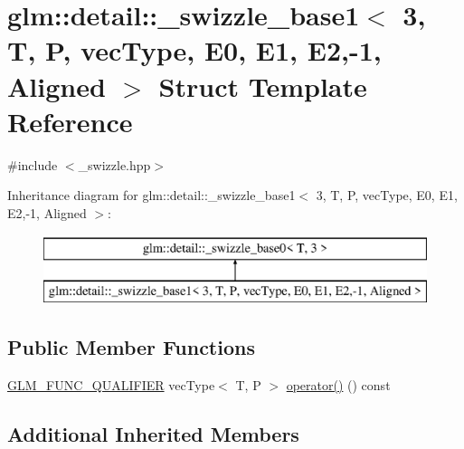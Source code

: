 \hypertarget{structglm_1_1detail_1_1__swizzle__base1_3_013_00_01_t_00_01_p_00_01vec_type_00_01_e0_00_01_e1_00_01_e2_00-1_00_01_aligned_01_4}{}\section{glm\+::detail\+::\+\_\+swizzle\+\_\+base1$<$ 3, T, P, vec\+Type, E0, E1, E2,-\/1, Aligned $>$ Struct Template Reference}
\label{structglm_1_1detail_1_1__swizzle__base1_3_013_00_01_t_00_01_p_00_01vec_type_00_01_e0_00_01_e1_00_01_e2_00-1_00_01_aligned_01_4}


{\ttfamily \#include $<$\+\_\+swizzle.\+hpp$>$}

Inheritance diagram for glm\+::detail\+::\+\_\+swizzle\+\_\+base1$<$ 3, T, P, vec\+Type, E0, E1, E2,-\/1, Aligned $>$\+:\begin{figure}[H]
\begin{center}
\leavevmode
\includegraphics[height=2.000000cm]{structglm_1_1detail_1_1__swizzle__base1_3_013_00_01_t_00_01_p_00_01vec_type_00_01_e0_00_01_e1_00_01_e2_00-1_00_01_aligned_01_4}
\end{center}
\end{figure}
\subsection*{Public Member Functions}
\begin{DoxyCompactItemize}
\item 
\mbox{\hyperlink{setup_8hpp_a33fdea6f91c5f834105f7415e2a64407}{G\+L\+M\+\_\+\+F\+U\+N\+C\+\_\+\+Q\+U\+A\+L\+I\+F\+I\+ER}} vec\+Type$<$ T, P $>$ \mbox{\hyperlink{structglm_1_1detail_1_1__swizzle__base1_3_013_00_01_t_00_01_p_00_01vec_type_00_01_e0_00_01_e1_00_01_e2_00-1_00_01_aligned_01_4_a09485ed63b638b9887bd49ba3220ab7b}{operator()}} () const
\end{DoxyCompactItemize}
\subsection*{Additional Inherited Members}


